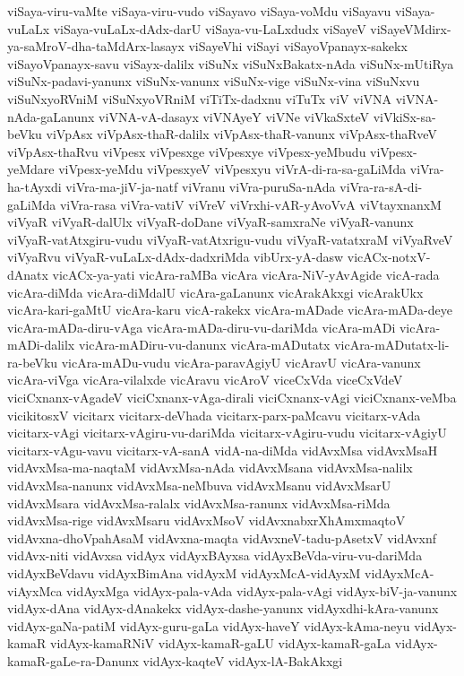 {viSaya-viru-vaMte
viSaya-viru-vudo
viSayavo
viSaya-voMdu
viSayavu
viSaya-vuLaLx
viSaya-vuLaLx-dAdx-darU
viSaya-vu-LaLxdudx
viSayeV
viSayeVMdirx-ya-saMroV-dha-taMdArx-lasayx
viSayeVhi
viSayi
viSayoVpanayx-sakekx
viSayoVpanayx-savu
viSayx-dalilx
viSuNx
viSuNxBakatx-nAda
viSuNx-mUtiRya
viSuNx-padavi-yanunx
viSuNx-vanunx
viSuNx-vige
viSuNx-vina
viSuNxvu
viSuNxyoRVniM
viSuNxyoVRniM
viTiTx-dadxnu
viTuTx
viV
viVNA
viVNA-nAda-gaLanunx
viVNA-vA-dasayx
viVNAyeY
viVNe
viVkaSxteV
viVkiSx-sa-beVku
viVpAsx
viVpAsx-thaR-dalilx
viVpAsx-thaR-vanunx
viVpAsx-thaRveV
viVpAsx-thaRvu
viVpesx
viVpesxge
viVpesxye
viVpesx-yeMbudu
viVpesx-yeMdare
viVpesx-yeMdu
viVpesxyeV
viVpesxyu
viVrA-di-ra-sa-gaLiMda
viVra-ha-tAyxdi
viVra-ma-jiV-ja-natf
viVranu
viVra-puruSa-nAda
viVra-ra-sA-di-gaLiMda
viVra-rasa
viVra-vatiV
viVreV
viVrxhi-vAR-yAvoVvA
viVtayxnanxM
viVyaR
viVyaR-dalUlx
viVyaR-doDane
viVyaR-samxraNe
viVyaR-vanunx
viVyaR-vatAtxgiru-vudu
viVyaR-vatAtxrigu-vudu
viVyaR-vatatxraM
viVyaRveV
viVyaRvu
viVyaR-vuLaLx-dAdx-dadxriMda
vibUrx-yA-dasw
vicACx-notxV-dAnatx
vicACx-ya-yati
vicAra-raMBa
vicAra
vicAra-NiV-yAvAgide
vicA-rada
vicAra-diMda
vicAra-diMdalU
vicAra-gaLanunx
vicArakAkxgi
vicArakUkx
vicAra-kari-gaMtU
vicAra-karu
vicA-rakekx
vicAra-mADade
vicAra-mADa-deye
vicAra-mADa-diru-vAga
vicAra-mADa-diru-vu-dariMda
vicAra-mADi
vicAra-mADi-dalilx
vicAra-mADiru-vu-danunx
vicAra-mADutatx
vicAra-mADutatx-li-ra-beVku
vicAra-mADu-vudu
vicAra-paravAgiyU
vicAravU
vicAra-vanunx
vicAra-viVga
vicAra-vilalxde
vicAravu
vicAroV
viceCxVda
viceCxVdeV
viciCxnanx-vAgadeV
viciCxnanx-vAga-dirali
viciCxnanx-vAgi
viciCxnanx-veMba
vicikitosxV
vicitarx
vicitarx-deVhada
vicitarx-parx-paMcavu
vicitarx-vAda
vicitarx-vAgi
vicitarx-vAgiru-vu-dariMda
vicitarx-vAgiru-vudu
vicitarx-vAgiyU
vicitarx-vAgu-vavu
vicitarx-vA-sanA
vidA-na-diMda
vidAvxMsa
vidAvxMsaH
vidAvxMsa-ma-naqtaM
vidAvxMsa-nAda
vidAvxMsana
vidAvxMsa-nalilx
vidAvxMsa-nanunx
vidAvxMsa-neMbuva
vidAvxMsanu
vidAvxMsarU
vidAvxMsara
vidAvxMsa-ralalx
vidAvxMsa-ranunx
vidAvxMsa-riMda
vidAvxMsa-rige
vidAvxMsaru
vidAvxMsoV
vidAvxnabxrXhAmxmaqtoV
vidAvxna-dhoVpahAsaM
vidAvxna-maqta
vidAvxneV-tadu-pAsetxV
vidAvxnf
vidAvx-niti
vidAvxsa
vidAyx
vidAyxBAyxsa
vidAyxBeVda-viru-vu-dariMda
vidAyxBeVdavu
vidAyxBimAna
vidAyxM
vidAyxMcA-vidAyxM
vidAyxMcA-viAyxMca
vidAyxMga
vidAyx-pala-vAda
vidAyx-pala-vAgi
vidAyx-biV-ja-vanunx
vidAyx-dAna
vidAyx-dAnakekx
vidAyx-dashe-yanunx
vidAyxdhi-kAra-vanunx
vidAyx-gaNa-patiM
vidAyx-guru-gaLa
vidAyx-haveY
vidAyx-kAma-neyu
vidAyx-kamaR
vidAyx-kamaRNiV
vidAyx-kamaR-gaLU
vidAyx-kamaR-gaLa
vidAyx-kamaR-gaLe-ra-Danunx
vidAyx-kaqteV
vidAyx-lA-BakAkxgi
}
